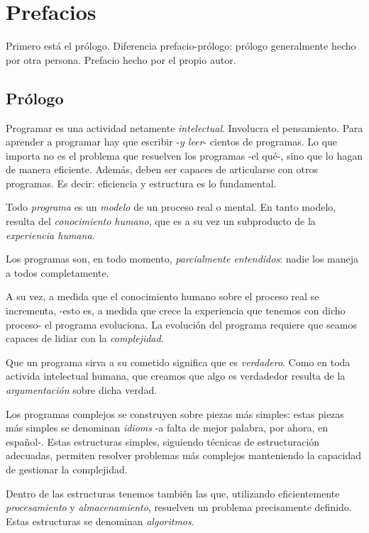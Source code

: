 \setcounter{section}{-1} %

\section{Prefacios}

Primero está el prólogo.
Diferencia prefacio-prólogo: prólogo generalmente hecho por otra persona.
Prefacio hecho por el propio autor.

\subsection{Prólogo}

Programar es una actividad netamente \textit{intelectual}.
Involucra el pensamiento.
Para aprender a programar hay que escribir -\textit{y leer}- cientos de programas.
Lo que importa no es el problema que resuelven los programas -el qué-,
sino que lo hagan de manera eficiente.
Además, deben ser capaces de articularse con otros programas.
Es decir: eficiencia y estructura es lo fundamental.

Todo \textit{programa} es un \textit{modelo} de un proceso real o mental.
En tanto modelo, resulta del \textit{conocimiento humano}, que es a su vez un subproducto de la \textit{experiencia humana}.

Los programas son,
en todo momento,
\textit{parcialmente entendidos}:
nadie los maneja a todos completamente.

A su vez,
a medida que el conocimiento humano sobre el proceso real se incrementa,
-esto es, a medida que crece la experiencia que tenemos con dicho proceso-
el programa evoluciona.
La evolución del programa requiere que seamos capaces de lidiar con la \textit{complejidad}.

Que un programa sirva a su cometido significa que es \textit{verdadero}.
Como en toda activida intelectual humana,
que creamos que algo es verdadedor resulta de la \textit{argumentación} sobre dicha verdad.

Los programas complejos se construyen sobre piezas más simples: 
estas piezas más simples se denominan \textit{idioms}
-a falta de mejor palabra, por ahora, en español-.
Estas estructuras simples,
siguiendo técnicas de estructuración adecuadas,
permiten resolver problemas más complejos manteniendo la capacidad de gestionar la complejidad.

Dentro de las estructuras tenemos también las que,
utilizando eficientemente \textit{procesamiento} y \textit{almacenamiento},
resuelven un problema precisamente definido.
Estas estructuras se denominan \textit{algoritmos}.

